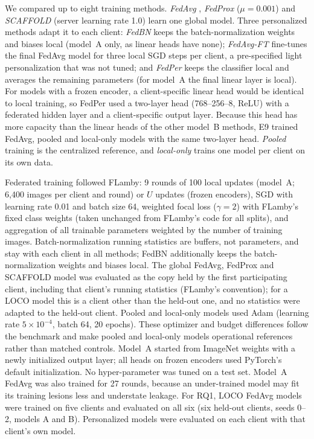 \documentclass[VANCOUVER,Times1COL]{WileyNJDv5}
\begin{document}
We compared up to eight training methods. \emph{FedAvg} \cite{mcmahan2017fedavg}, \emph{FedProx}
\cite{li2020fedprox} ($\mu=0.001$) and \emph{SCAFFOLD} \cite{karimireddy2020scaffold} (server learning
rate 1.0) learn one global model. Three personalized methods adapt it to each client:
\emph{FedBN} \cite{li2021fedbn} keeps the batch-normalization weights and biases local (model~A only, as
linear heads have none); \emph{FedAvg-FT} fine-tunes the final FedAvg model for three local SGD steps per
client, a pre-specified light personalization that was not tuned; and \emph{FedPer}
\cite{arivazhagan2019fedper} keeps the classifier local and averages the remaining parameters (for
model~A the final linear layer is local). For models with a frozen encoder, a client-specific linear head
would be identical to local training, so FedPer used a two-layer head (768--256--8, ReLU) with a
federated hidden layer and a client-specific output layer. Because this head has more capacity than the
linear heads of the other model~B methods, E9 trained FedAvg, pooled and local-only models with the same
two-layer head. \emph{Pooled} training is the centralized reference, and \emph{local-only} trains one model
per client on its own data.

Federated training followed FLamby: 9 rounds of 100 local updates (model~A; 6,400 images per client and
round) or $U$ updates (frozen encoders), SGD with learning rate 0.01 and batch size 64, weighted focal loss
\cite{lin2017focal} ($\gamma=2$) with FLamby's fixed class weights (taken unchanged from FLamby's code
for all splits), and aggregation of all trainable parameters weighted by the number of training images.
Batch-normalization running statistics are buffers, not parameters, and stay with each client in all
methods; FedBN additionally keeps the batch-normalization weights and biases local. The global FedAvg,
FedProx and SCAFFOLD model was evaluated as the copy held by the first participating client, including
that client's running statistics (FLamby's convention); for a LOCO model this is a client other than the
held-out one, and no statistics were adapted to the held-out client. Pooled and local-only models used
Adam \cite{kingma2015adam} (learning rate $5\times10^{-4}$, batch 64, 20 epochs). These optimizer and
budget differences follow the benchmark and make pooled and local-only models operational references
rather than matched controls. Model~A started from ImageNet weights with a newly initialized output layer;
all heads on frozen encoders used PyTorch's default initialization. No hyper-parameter was tuned on a test
set. Model~A FedAvg was also trained for 27 rounds, because an under-trained model may fit its training
lesions less and understate leakage. For RQ1, LOCO FedAvg models were trained on five clients and
evaluated on all six (six held-out clients, seeds 0--2, models A and B). Personalized models were
evaluated on each client with that client's own model.
\end{document}

